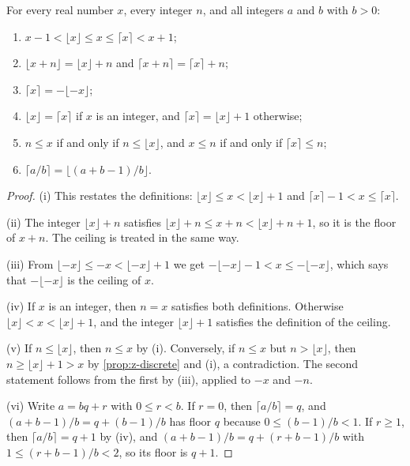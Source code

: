 \begin{proposition}
\label{prop:floor}
For every real number $x$, every integer $n$, and all integers $a$ and $b$ with $b>0$:
\begin{enumerate}
\item $x-1<\lfloor x\rfloor\le x\le\lceil x\rceil<x+1$;
\item $\lfloor x+n\rfloor=\lfloor x\rfloor+n$ and $\lceil x+n\rceil=\lceil x\rceil+n$;
\item $\lceil x\rceil=-\lfloor-x\rfloor$;
\item $\lfloor x\rfloor=\lceil x\rceil$ if $x$ is an integer, and $\lceil x\rceil=\lfloor x\rfloor+1$ otherwise;
\item $n\le x$ if and only if $n\le\lfloor x\rfloor$, and $x\le n$ if and only if $\lceil x\rceil\le n$;
\item $\lceil a/b\rceil=\lfloor(a+b-1)/b\rfloor$.
\end{enumerate}
\end{proposition}

\begin{proof}
(i) This restates the definitions: $\lfloor x\rfloor\le x<\lfloor x\rfloor+1$ and $\lceil x\rceil-1<x\le\lceil x\rceil$.

(ii) The integer $\lfloor x\rfloor+n$ satisfies $\lfloor x\rfloor+n\le x+n<\lfloor x\rfloor+n+1$, so it is the floor of $x+n$. The ceiling is treated in the same way.

(iii) From $\lfloor-x\rfloor\le-x<\lfloor-x\rfloor+1$ we get $-\lfloor-x\rfloor-1<x\le-\lfloor-x\rfloor$, which says that $-\lfloor-x\rfloor$ is the ceiling of $x$.

(iv) If $x$ is an integer, then $n=x$ satisfies both definitions. Otherwise $\lfloor x\rfloor<x<\lfloor x\rfloor+1$, and the integer $\lfloor x\rfloor+1$ satisfies the definition of the ceiling.

(v) If $n\le\lfloor x\rfloor$, then $n\le x$ by (i). Conversely, if $n\le x$ but $n>\lfloor x\rfloor$, then $n\ge\lfloor x\rfloor+1>x$ by \cref{prop:z-discrete} and (i), a contradiction. The second statement follows from the first by (iii), applied to $-x$ and $-n$.

(vi) Write $a=bq+r$ with $0\le r<b$. If $r=0$, then $\lceil a/b\rceil=q$, and $(a+b-1)/b=q+(b-1)/b$ has floor $q$ because $0\le(b-1)/b<1$. If $r\ge1$, then $\lceil a/b\rceil=q+1$ by (iv), and $(a+b-1)/b=q+(r+b-1)/b$ with $1\le(r+b-1)/b<2$, so its floor is $q+1$.
\end{proof}


